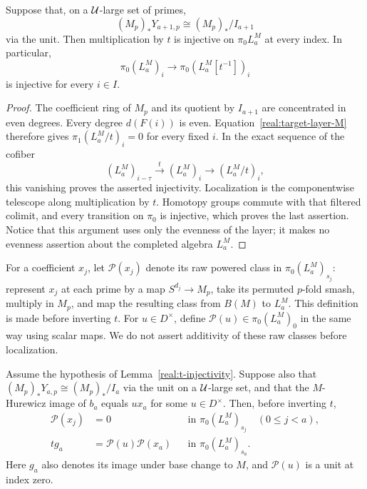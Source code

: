 \begin{lemma}\label{real:t-injectivity}
Suppose that, on a \(\mathcal U\)-large set of primes,
\[
 (M_p)_*Y_{a+1,p}\cong (M_p)_*/I_{a+1}
\]
via the unit.  Then multiplication by \(t\) is injective on
\(\pi_0L_a^M\) at every index.  In particular,
\[
 \pi_0(L_a^M)_i\longrightarrow
 \pi_0(L_a^M[t^{-1}])_i
\]
is injective for every \(i\in I\).
\end{lemma}

\begin{proof}
The coefficient ring of \(M_p\) and its quotient by \(I_{a+1}\)
are concentrated in even degrees.  Every degree \(d(F(i))\) is
even.  Equation~\eqref{real:target-layer-M} therefore gives
\(\pi_1(L_a^M/t)_i=0\) for every fixed \(i\).  In the exact
sequence of the cofiber
\[
 (L_a^M)_{i-\tau}\xrightarrow{t}(L_a^M)_i
 \longrightarrow (L_a^M/t)_i,
\]
this vanishing proves the asserted injectivity.  Localization is the
componentwise telescope along multiplication by \(t\).  Homotopy
groups commute with that filtered colimit, and every transition on
\(\pi_0\) is injective, which proves the last assertion.  Notice
that this argument uses only the evenness of the layer; it makes no
evenness assertion about the completed algebra \(L_a^M\).
\end{proof}

For a coefficient \(x_j\), let \(\mathcal P(x_j)\) denote its
raw powered class in \(\pi_0(L_a^M)_{s_j}\): represent \(x_j\)
at each prime by a map \(S^{d_j}\to M_p\), take its permuted
\(p\)-fold smash, multiply in \(M_p\), and map the resulting
class from \(B(M)\) to \(L_a^M\).  This definition is made
before inverting \(t\).  For \(u\in D^\times\), define
\(\mathcal P(u)\in\pi_0(L_a^M)_0\) in the same way using
scalar maps.  We do not assert additivity of these raw classes
before localization.

\begin{lemma}\label{real:raw-powers}
Assume the hypothesis of Lemma~\ref{real:t-injectivity}.  Suppose
also that \((M_p)_*Y_{a,p}\cong (M_p)_*/I_a\) via the unit on
a \(\mathcal U\)-large set, and that the \(M\)-Hurewicz image of
\(b_a\) equals \(u x_a\) for some \(u\in D^\times\).
Then, before inverting \(t\),
\begin{equation}
 \begin{aligned}
  \mathcal P(x_j)&=0
     &&\text{in }\pi_0(L_a^M)_{s_j}\quad(0\leq j<a),\\
  t g_a&=\mathcal P(u)\mathcal P(x_a)
     &&\text{in }\pi_0(L_a^M)_{s_a}.
 \end{aligned}
 \label{eq:before-inversion}
\end{equation}
Here \(g_a\) also denotes its image under base change to \(M\),
and \(\mathcal P(u)\) is a unit at index zero.
\end{lemma}

